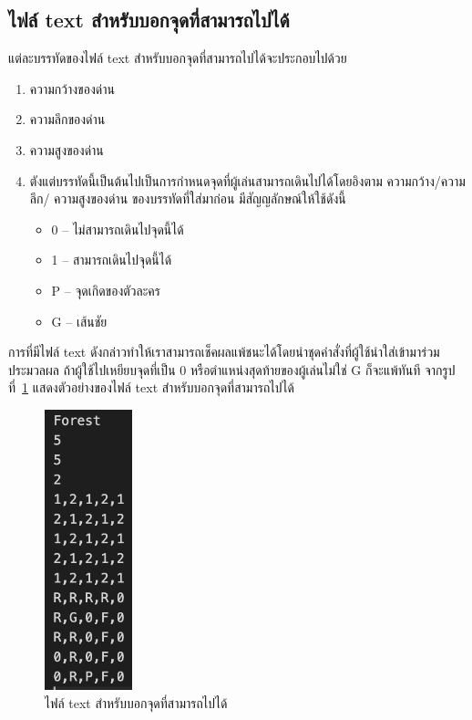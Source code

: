 \subsection{ไฟล์ text สำหรับบอกจุดที่สามารถไปได้}
แต่ละบรรทัดของไฟล์ text สำหรับบอกจุดที่สามารถไปได้จะประกอบไปด้วย
\begin{enumerate}
    \item ความกว้างของด่าน
    \item ความลึกของด่าน
    \item ความสูงของด่าน
    \item ตังแต่บรรทัดนี้เป็นต้นไปเป็นการกำหนดจุดที่ผู้เล่นสามารถเดินไปได้โดยอิงตาม ความกว้าง/ความลึก/ \newline ความสูงของด่าน ของบรรทัดที่ใส่มาก่อน มีสัญญลักษณ์ให้ใช้ดังนี้
    \begin{itemize}
        \item 0 -- ไม่สามารถเดินไปจุดนี้ได้
        \item 1 -- สามารถเดินไปจุดนี้ได้
        \item P -- จุดเกิดของตัวละคร
        \item G -- เส้นชัย
    \end{itemize}
\end{enumerate}
การที่มีไฟล์ text ดังกล่าวทำให้เราสามารถเช็คผลแพ้ชนะได้โดยนำชุดคำสั่งที่ผู้ใช้นำใส่เข้ามาร่วมประมวลผล ถ้าผู้ใช้ไปเหยียบจุดที่เป็น 0
หรือตำแหน่งสุดท้ายของผู้เล่นไม่ใช่ G ก็จะแพ้ทันที จากรูปที่~\ref{ft2} แสดงตัวอย่างของไฟล์ text สำหรับบอกจุดที่สามารถไปได้
\begin{figure}[h!]
    \begin{center}
    \includegraphics[width=1in]{pic-toro/filetext2.png}
    \end{center}
    \caption[Text]{ไฟล์ text สำหรับบอกจุดที่สามารถไปได้}
    \label{ft2}
    \end{figure}

